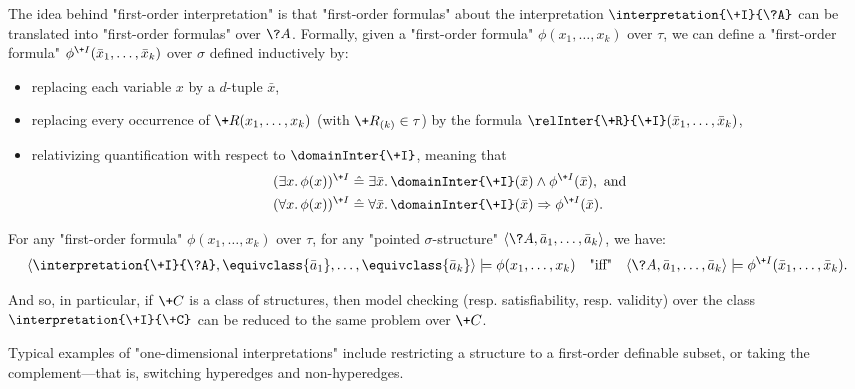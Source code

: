 The idea behind "first-order interpretation" is that
"first-order formulas" about the interpretation $\interpretation{\+I}{\?A}$
can be translated into "first-order formulas" over $\?A$.
Formally, given a "first-order formula" $\phi(x_1,\hdots,x_k)$ over $\tau$,
we can define a "first-order formula" $\phi^{\+I}(\bar x_1,\hdots,\bar x_k)$ over $\sigma$
defined inductively by:
\begin{itemize}
	\item replacing each variable $x$ by a $d$-tuple $\bar x$,
	\item replacing every occurrence of
		$\+R(x_1,\hdots, x_k)$ (with $\+R_{(k)} \in \tau$)
		by the formula $\relInter{\+R}{\+I}(\bar x_1, \hdots, \bar x_k)$,
	\item relativizing quantification with respect to $\domainInter{\+I}$,
		meaning that
		\begin{align*}
			(\exists x.\, \phi(x))^{\+I} 
			& \defeq \exists \bar x.\, \domainInter{\+I}(\bar x) \land \phi^{\+I}(\bar x),
			\text{ and} \\ 
			(\forall x.\, \phi(x))^{\+I} 
			& \defeq \forall \bar x.\, \domainInter{\+I}(\bar x) \Rightarrow \phi^{\+I}(\bar x).
		\end{align*}
\end{itemize} 
\begin{proposition}
	\AP\label{prop:first-order-interpretation}
	For any "first-order formula" $\phi(x_1,\hdots,x_k)$ over $\tau$,
	for any "pointed $\sigma$-structure" $\tup{\?A, \bar a_1,\hdots, \bar a_k}$, we have:
	\[
		\tup{\interpretation{\+I}{\?A}, \equivclass{\bar a_1}, \hdots, \equivclass{\bar a_k}}
		\models \phi(x_1, \hdots, x_k)
		\quad\text{"iff"}\quad
		\tup{\?A, \bar a_1,\hdots, \bar a_k} \models \phi^{\+I}(\bar x_1,\hdots,\bar x_k).
	\]
\end{proposition}
And so, in particular, if $\+C$ is a class of structures, then
model checking (resp. satisfiability, resp. validity) over the class $\interpretation{\+I}{\+C}$
can be reduced to the same problem over $\+C$.

Typical examples of "one-dimensional interpretations" include
restricting a structure to a first-order definable subset, 
or taking the complement---that is, switching hyperedges and non-hyperedges.

